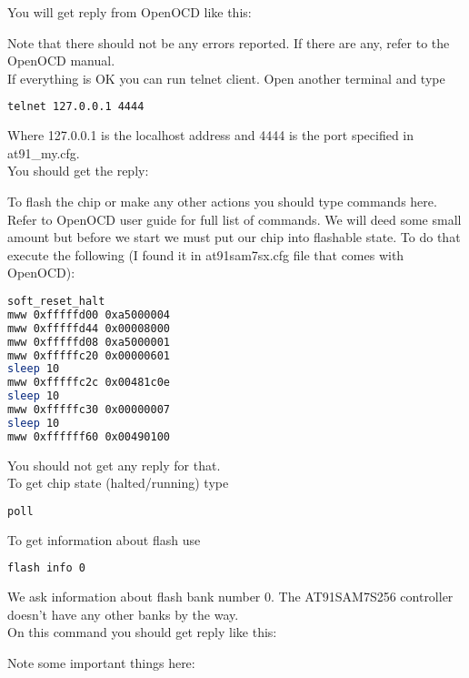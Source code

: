 \documentclass[11pt]{article}
\begin{document}
		You will get reply from OpenOCD like this:
		
		Note that there should not be any errors reported. If there are any, refer to the OpenOCD manual.\\
		If everything is OK you can run telnet client. Open another terminal and type
		\begin{lstlisting}[language=bash]
telnet 127.0.0.1 4444
		\end{lstlisting}
		Where 127.0.0.1 is the localhost address and 4444 is the port specified in at91\_my.cfg.\\
		You should get the reply:
		
		To flash the chip or make any other actions you should type commands here. Refer to OpenOCD user guide for full list of commands. We will deed some small amount but before we start we must put our chip into flashable state. To do that execute the following (I found it in at91sam7sx.cfg file that comes with OpenOCD):
		\begin{lstlisting}[language=bash]
soft_reset_halt
mww 0xfffffd00 0xa5000004
mww 0xfffffd44 0x00008000
mww 0xfffffd08 0xa5000001
mww 0xfffffc20 0x00000601
sleep 10
mww 0xfffffc2c 0x00481c0e
sleep 10
mww 0xfffffc30 0x00000007
sleep 10
mww 0xffffff60 0x00490100
		\end{lstlisting}
		You should not get any reply for that.\\
		To get chip state (halted/running) type

		\begin{lstlisting}[language=bash]
poll
		\end{lstlisting}

		To get information about flash use

		\begin{lstlisting}[language=bash]
flash info 0
		\end{lstlisting}

		We ask information about flash bank number 0. The AT91SAM7S256 controller doesn't have any other banks by the way.\\
		On this command you should get reply like this:
		
		Note some important things here:
\end{document}
